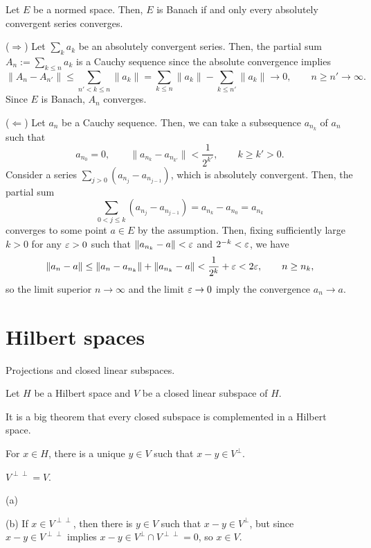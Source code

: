 \documentclass{../../large}
\begin{document}
\begin{prb}
Let $E$ be a normed space.
Then, $E$ is Banach if and only every absolutely convergent series converges.
\end{prb}
\begin{pf}
($\Rightarrow$)
Let $\sum_ka_k$ be an absolutely convergent series.
Then, the partial sum $A_n:=\sum_{k\le n}a_k$ is a Cauchy sequence since the absolute convergence implies
\[\|A_n-A_{n'}\|\le\sum_{n'<k\le n}\|a_k\|=\sum_{k\le n}\|a_k\|-\sum_{k\le n'}\|a_k\|\to0,\qquad n\ge n'\to\infty.\]
Since $E$ is Banach, $A_n$ converges.

($\Leftarrow$)
Let $a_n$ be a Cauchy sequence.
Then, we can take a subsequence $a_{n_k}$ of $a_n$ such that
\[a_{n_0}=0,\qquad\|a_{n_k}-a_{n_{k'}}\|<\frac1{2^{k'}},\qquad k\ge k'>0.\]
Consider a series $\sum_{j>0}(a_{n_j}-a_{n_{j-1}})$, which is absolutely convergent.
Then, the partial sum
\[\sum_{0<j\le k}(a_{n_j}-a_{n_{j-1}})=a_{n_k}-a_{n_0}=a_{n_k}\]
converges to some point $a\in E$ by the assumption.
Then, fixing sufficiently large $k>0$ for any $\varepsilon>0$ such that $\|a_{n_k}-a\|<\varepsilon$ and $2^{-k}<\varepsilon$, we have
\[\|a_n-a\|\le\|a_n-a_{n_k}\|+\|a_{n_k}-a\|<\frac1{2^k}+\varepsilon<2\varepsilon,\qquad n\ge n_k,\]
so the limit superior $n\to\infty$ and the limit $\varepsilon\to0$ imply the convergence $a_n\to a$.
\end{pf}



\begin{prb}
\end{prb}

\section{Hilbert spaces}


\begin{prb}
Projections and closed linear subspaces.

Let $H$ be a Hilbert space and $V$ be a closed linear subspace of $H$.

It is a big theorem that every closed subspace is complemented in a Hilbert space.


\begin{parts}
\item For $x\in H$, there is a unique $y\in V$ such that $x-y\in V^\perp$.
\item $V^{\perp\perp}=V$.
\end{parts}
\end{prb}
\begin{pf}
(a)


(b)
If $x\in V^{\perp\perp}$, then there is $y\in V$ such that $x-y\in V^\perp$, but since $x-y\in V^{\perp\perp}$ implies $x-y\in V^\perp\cap V^{\perp\perp}=0$, so $x\in V$.

\end{pf}
\end{document}
